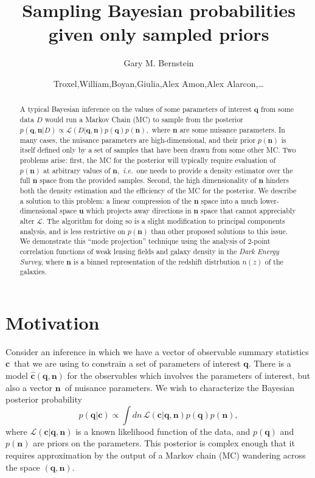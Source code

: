 \documentclass[linenumbers, onecolumn]{aastex63}
\newcommand{\ie}{\textit{i.e.}}
\newcommand{\vecc}{\ensuremath{\mathbf{c}}}
\newcommand{\vecq}{\ensuremath{\mathbf{q}}}
\newcommand{\vecn}{\ensuremath{\mathbf{n}}}
\newcommand{\vecu}{\ensuremath{\mathbf{u}}}
\newcommand{\hatc}{\ensuremath{\hat{\mathbf{c}}}}
\newcommand{\likeli}{\mathcal{L}}
\begin{document}
\title{Sampling Bayesian probabilities given only sampled priors}

\author[0000-0002-8613-8259]{Gary M. Bernstein}

\author{Troxel,William,Boyan,Giulia,Alex Amon,Alex Alarcon,\ldots}

\begin{abstract}
	\vspace{0.2in}
A typical Bayesian inference on the values of some parameters of
interest $\vecq$ from some data $D$ would run a Markov Chain (MC) to sample
from the posterior $p(\vecq,\vecn | D) \propto \likeli(D | \vecq,\vecn)
p(\vecq) p(\vecn),$ where $\vecn$ are some nuisance parameters.  In
many cases, the nuisance parameters are high-dimensional, and their
prior $p(\vecn)$ is itself defined only by a set of samples that have
been drawn from some other MC.  Two problems arise: first,
the MC for the posterior will typically require evaluation of
$p(\vecn)$ at arbitrary values of $\vecn,$ \ie\ one needs to provide a
density estimator over the full $\vecn$ space from the provided
samples.  Second, the high dimensionality of $\vecn$ hinders both the
density estimation and the efficiency of the MC for the posterior.  We
describe a solution to this problem: a linear compression of the
$\vecn$ space into a much lower-dimensional space $\vecu$ which
projects away directions in $\vecn$ space that cannot appreciably
alter $\likeli.$ The algorithm for doing so is a slight modification
to principal components analysis, and is less restrictive on
$p(\vecn)$ than other proposed solutions to this issue.
We demonstrate this ``mode projection'' technique using the analysis
of 2-point correlation functions of weak lensing fields and galaxy
density in the \textit{Dark Energy Survey}, where $\vecn$ is a binned representation of the redshift distrbution
$n(z)$ of the galaxies.
\end{abstract}
\reportnum{}

\section{Motivation} \label{sec:intro}

Consider an inference in which we have a vector of observable summary
statistics \vecc\ that we are using to constrain a set of parameters of
interest \vecq.  There is a model $\hatc(\vecq,\vecn)$ for the
observables which involves the parameters of interest, but also a
vector \vecn\ of nuisance parameters.  
We wish to characterize the Bayesian posterior probability
\begin{equation}
  p(\vecq | \vecc) \propto \int dn\, \likeli(\vecc | \vecq, \vecn) p(\vecq) p(\vecn),
\label{eq:posterior}
\end{equation}
where $\likeli(\vecc | \vecq, \vecn)$ is a known likelihood function
of the data, and $p(\vecq)$ and $p(\vecn)$ are priors on the
parameters.  This posterior is complex enough that it requires
approximation by the output of a Markov chain (MC) wandering across the space $(\vecq,\vecn).$
\end{document}
